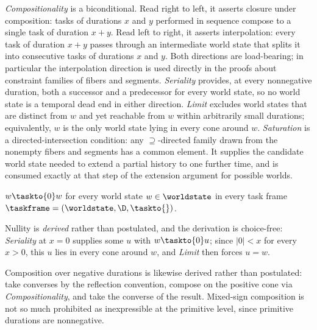 \documentclass[../BimodalReference.tex]{subfiles}
\begin{document}
\noindent
\emph{Compositionality} is a biconditional.
Read right to left, it asserts closure under composition: tasks of durations $x$ and $y$ performed in sequence compose to a single task of duration $x + y$.
Read left to right, it asserts interpolation: every task of duration $x + y$ passes through an intermediate world state that splits it into consecutive tasks of durations $x$ and $y$.
Both directions are load-bearing; in particular the interpolation direction is used directly in the proofs about constraint families of fibers and segments.
\emph{Seriality} provides, at every nonnegative duration, both a successor and a predecessor for every world state, so no world state is a temporal dead end in either direction.
\emph{Limit} excludes world states that are distinct from $w$ and yet reachable from $w$ within arbitrarily small durations; equivalently, $w$ is the only world state lying in every cone around $w$.
\emph{Saturation} is a directed-intersection condition: any $\supseteq$-directed family drawn from the nonempty fibers and segments has a common element.
It supplies the candidate world state needed to extend a partial history to one further time, and is consumed exactly at that step of the extension argument for possible worlds.

\begin{lemma}[Nullity]\label{lem:nullity}
$w \taskto{0} w$ for every world state $w \in \worldstate$ in every task frame $\taskframe = (\worldstate, \D, {\taskto{}})$.
\end{lemma}

\noindent
Nullity is \emph{derived} rather than postulated, and the derivation is choice-free: \emph{Seriality} at $x = 0$ supplies some $u$ with $w \taskto{0} u$; since $|0| < x$ for every $x > 0$, this $u$ lies in every cone around $w$, and \emph{Limit} then forces $u = w$.

\begin{remark}
Composition over negative durations is likewise derived rather than postulated: take converses by the reflection convention, compose on the positive cone via \emph{Compositionality}, and take the converse of the result.
Mixed-sign composition is not so much prohibited as inexpressible at the primitive level, since primitive durations are nonnegative.
\end{remark}
\end{document}
